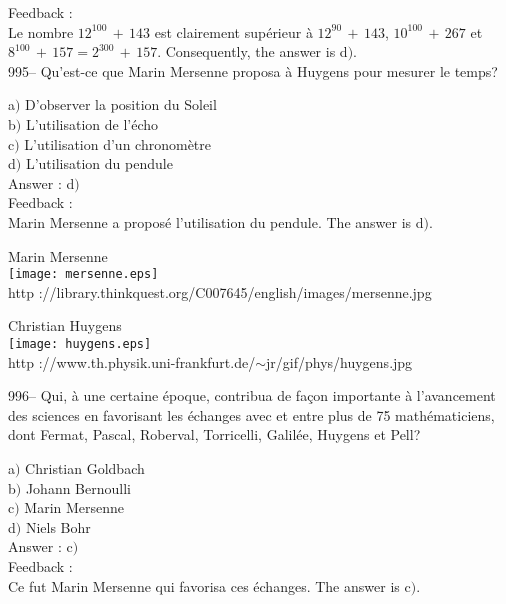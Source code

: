 \documentclass[letterpaper, 12pt]{article}
\begin{document}
Feedback : \\
Le nombre $12^{100}\,+\,143$ est clairement sup\'erieur \`a
$12^{90}\,+\,143$, $10^{100}\,+\,267$ et
$8^{100}\,+\,157=2^{300}\,+\,157$.
Consequently, the answer is d$)$.\\

995-- Qu'est-ce que Marin Mersenne proposa \`a Huygens pour mesurer
le temps?

a$)$ D'observer la position du Soleil \\
b$)$ L'utilisation de l'\'echo \\
c$)$ L'utilisation d'un chronom\`etre \\
d$)$ L'utilisation du pendule\\

Answer : d$)$\\

Feedback : \\
Marin Mersenne a propos\'e l'utilisation du pendule.
The answer is d$)$.\\

        \begin{center}
        Marin Mersenne\\
    \texttt{[image: mersenne.eps]}\\
        {\footnotesize http
://library.thinkquest.org/C007645/english/images/mersenne.jpg}
    \end{center}

        \begin{center}
        Christian Huygens\\
    \texttt{[image: huygens.eps]}\\
        {\footnotesize http
://www.th.physik.uni-frankfurt.de/$\sim$jr/gif/phys/huygens.jpg}
    \end{center}

996-- Qui, \`a une certaine \'epoque, contribua de fa\c con importante \`a
l'avancement des sciences en favorisant
les \'echanges avec et entre plus de 75 math\'ematiciens, dont Fermat,
Pascal, Roberval, Torricelli, Galil\'ee, Huygens et Pell?

a$)$ Christian Goldbach \\
b$)$ Johann Bernoulli \\
c$)$ Marin Mersenne \\
d$)$ Niels Bohr \\

Answer : c$)$\\

Feedback : \\
Ce fut Marin Mersenne qui favorisa ces \'echanges.
The answer is c$)$.\\
\end{document}
